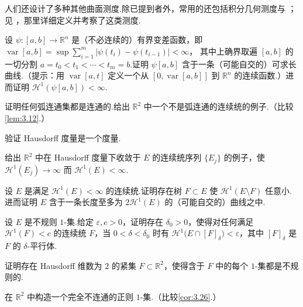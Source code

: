 人们还设计了多种其他曲面测度.除已提到者外，常用的还包括积分几何测度与 ；见 \textcite{federer1969}，那里详细定义并考察了这类测度.

\begin{exercises}
\item 设 $\psi:[a,b]\to\mathbb{R}^n$ 是（不必连续的）有界变差函数，即
$\operatorname{var}[a,b]=\sup\sum_{i=1}^{m}|\psi(t_i)-\psi(t_{i-1})|<\infty$，
其中上确界取遍 $[a,b]$ 的一切分割 $a=t_0<t_1<\cdots<t_m=b$.证明 $\psi[a,b]$ 含于一条（可能自交的）可求长曲线.（提示：用 $\operatorname{var}[a,t]$ 定义一个从 $[0,\operatorname{var}[a,b]]$ 到 $\mathbb{R}^n$ 的连续函数.）进而证明 $\mathcal{H}^1(\psi[a,b])<\infty$.
\item 证明任何弧连通集都是连通的.给出 $\mathbb{R}^2$ 中一个不是弧连通的连续统的例子.（比较\cref{lem:3.12}.）
\item 验证 Hausdorff 度量是一个度量.
\item 给出 $\mathbb{R}^2$ 中在 Hausdorff 度量下收敛于 $E$ 的连续统序列 $\{E_j\}$ 的例子，使 $\mathcal{H}^1(E_j)\to\infty$ 而 $\mathcal{H}^1(E)<\infty$.
\item 设 $E$ 是满足 $\mathcal{H}^1(E)<\infty$ 的连续统.证明存在树 $F\subset E$ 使 $\mathcal{H}^1(E\setminus F)$ 任意小.进而证明 $E$ 含于一条长度至多为 $2\mathcal{H}^1(E)$ 的（可能自交的）曲线之中.
\item 设 $E$ 是不规则 $1$-集.给定 $\varepsilon,c>0$，证明存在 $\delta_0>0$，使得对任何满足 $\mathcal{H}^1(F)<c$ 的连续统 $F$，当 $0<\delta<\delta_0$ 时有 $\mathcal{H}^1\bigl(E\cap[F]_{\delta}\bigr)<\varepsilon$，其中 $[F]_{\delta}$ 是 $F$ 的 $\delta$-平行体.
\item 证明存在 Hausdorff 维数为 $2$ 的紧集 $F\subset\mathbb{R}^2$，使得含于 $F$ 中的每个 $1$-集都是不规则的.
\item 在 $\mathbb{R}^2$ 中构造一个完全不连通的正则 $1$-集.（比较\cref{cor:3.26}.）
\end{exercises}
